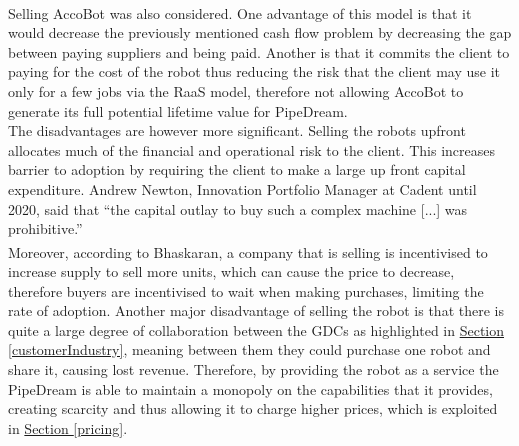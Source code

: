 \documentclass[11pt]{article}		%
\newcommand{\supercite}[1]{\textsuperscript{\cite{#1}}}		%
\newcommand{\sectref}[1]{\hyperref[#1]{Section \ref*{#1}}}     %
\begin{document}
            \\ 
            \hspace*{2ex}
        \hspace*{2ex}
            Selling AccoBot was also considered.
            One advantage of this model is that it would decrease the previously mentioned cash flow problem by decreasing the gap between paying suppliers and being paid. Another is that it commits the client to paying for the cost of the robot thus reducing the risk that the client may use it only for a few jobs via the RaaS model, therefore not allowing AccoBot to generate its full potential lifetime value for PipeDream.
            \\
            \hspace*{2ex} The disadvantages are however more significant. Selling the robots upfront allocates much of the financial and operational risk to the client. This increases barrier to adoption by requiring the client to make a large up front capital expenditure. Andrew Newton, Innovation Portfolio Manager at Cadent until 2020, said that “the capital outlay to buy such a complex machine [...] was prohibitive.”
            \\
        \hspace*{2ex}Moreover, according to Bhaskaran\supercite{leasing_strategy}, a company that is selling is incentivised to increase supply to sell more units, which can cause the price to decrease, therefore buyers are incentivised to wait when making purchases, limiting the rate of adoption. Another major disadvantage of selling the robot is that there is quite a large degree of collaboration between the GDCs as highlighted in \sectref{customerIndustry}, meaning between them they could purchase one robot and share it, causing lost revenue. Therefore, by providing the robot as a service the PipeDream is able to maintain a monopoly on the capabilities that it provides, creating scarcity and thus allowing it to charge higher prices, which is exploited in \sectref{pricing}.
\end{document}
